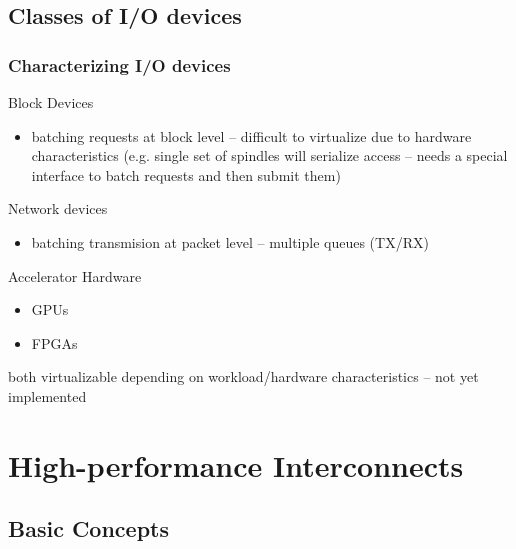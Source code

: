 \documentclass[red,slidestop,notes,compress,mathserif]{beamer}
\begin{document}
\subsection{Classes of I/O devices}

\begin{frame}
\frametitle{Characterizing I/O devices}
        \begin{block}{Block Devices}
		\begin{itemize} \item batching requests at block level --
                difficult to virtualize due to hardware characteristics (e.g. single set of
                spindles will serialize access -- needs a special interface to batch requests
                and then submit them)
                \end{itemize}
        \end{block}
        \begin{block}{Network devices}
                \begin{itemize}
                    \item batching transmision at packet level -- multiple queues (TX/RX)
                \end{itemize}
        \end{block}
        \begin{block}{Accelerator Hardware}
                \begin{itemize}
                    \item GPUs
                    \item FPGAs
                \end{itemize}
                both virtualizable depending on workload/hardware characteristics -- not yet implemented
        \end{block}
\end{frame}

\section{High-performance Interconnects}

\subsection{Basic Concepts}
\end{document}
